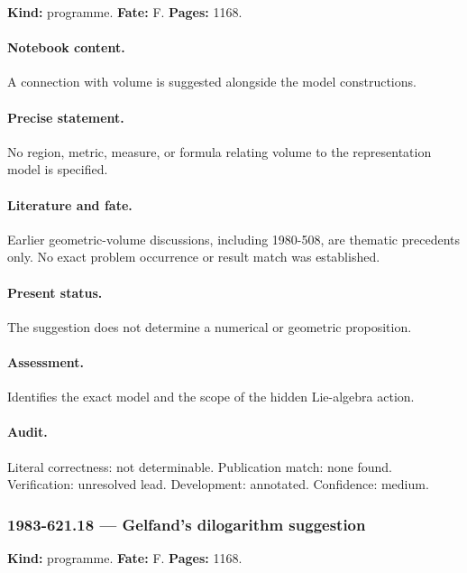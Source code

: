 \label{item:1983-621.17}

\noindent\textbf{Kind:} programme. \textbf{Fate:} F. \textbf{Pages:} 1168.\par

\paragraph{Notebook content.} A connection with volume is suggested alongside the model constructions.

\paragraph{Precise statement.} No region, metric, measure, or formula relating volume to the representation model is specified.

\paragraph{Literature and fate.} Earlier geometric-volume discussions, including 1980-508, are thematic precedents only. No exact problem occurrence or result match was established.

\paragraph{Present status.} The suggestion does not determine a numerical or geometric proposition.

\paragraph{Assessment.} Identifies the exact model and the scope of the hidden Lie-algebra action.

\paragraph{Audit.} Literal correctness: not determinable. Publication match: none found. Verification: unresolved lead. Development: annotated. Confidence: medium.

\subsubsection{1983-621.18 --- Gelfand’s dilogarithm suggestion}

\label{item:1983-621.18}

\noindent\textbf{Kind:} programme. \textbf{Fate:} F. \textbf{Pages:} 1168.\par

